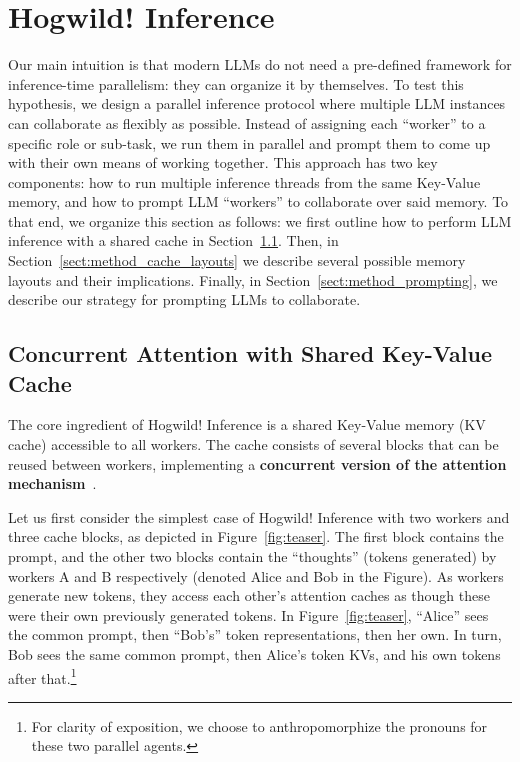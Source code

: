 \vspace{-5px}\section{Hogwild! Inference}\label{sect:method}\vspace{-5px}

Our main intuition is that modern LLMs do not need a pre-defined framework for inference-time parallelism: they can organize it by themselves. 
To test this hypothesis, we design a parallel inference protocol where multiple LLM instances can collaborate as flexibly as possible. Instead of assigning each ``worker'' to a specific role or sub-task, we run them in parallel and prompt them to come up with their own means of working together. This approach has two key components: how to run multiple inference threads from the same Key-Value memory, and how to prompt LLM ``workers'' to collaborate over said memory. To that end, we organize this section as follows: we first outline how to perform LLM inference with a shared cache in Section~\ref{sect:method_basic_idea}. Then, in Section~\ref{sect:method_cache_layouts} we describe several possible memory layouts and their implications.
Finally, in Section~\ref{sect:method_prompting}, we describe our strategy for prompting LLMs to collaborate.

\vspace{-5px}\subsection{Concurrent Attention with Shared Key-Value Cache}\label{sect:method_basic_idea}\vspace{-5px}

The core ingredient of Hogwild!\! Inference is a shared Key-Value memory (KV cache) accessible to all workers. The cache consists of several blocks that can be reused between workers, implementing a \textbf{concurrent version of the attention mechanism}~\citep{bahdanau2014neural, vaswani2017attention}. 

Let us first consider the simplest case of Hogwild! Inference with two workers and three cache blocks, as depicted in Figure~\ref{fig:teaser}. The first block contains the prompt, and the other two blocks contain the ``thoughts'' (tokens generated) by workers A and B respectively (denoted Alice and Bob in the Figure).
As workers generate new tokens, they access each other's attention caches as though these were their own previously generated tokens. In Figure~\ref{fig:teaser}, ``Alice'' sees the common prompt, then ``Bob's'' token representations, then her own. In turn, Bob sees the same common prompt, then Alice's token KVs, and his own tokens after that.\footnote[3]{For clarity of exposition, we choose to anthropomorphize the pronouns for these two parallel agents.} 

